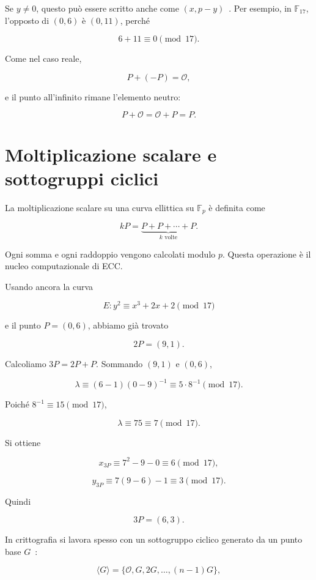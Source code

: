 \documentclass[12pt,a4paper,oneside]{report}
\begin{document}
Se \(y\neq 0\), questo può essere scritto anche come \((x,p-y)\)~\cite{margara_ec}. Per esempio, in \(\mathbb{F}_{17}\), l'opposto di \((0,6)\) è \((0,11)\), perché

\[
6+11\equiv 0\pmod{17}.
\]

Come nel caso reale,

\[
P+(-P)=\mathcal{O},
\]

e il punto all'infinito rimane l'elemento neutro:

\[
P+\mathcal{O}=\mathcal{O}+P=P.
\]

\section{Moltiplicazione scalare e sottogruppi ciclici}

La moltiplicazione scalare su una curva ellittica su \(\mathbb{F}_p\) è definita come~\cite{margara_ec,sec1}

\begin{equation}
    kP=\underbrace{P+P+\cdots+P}_{k\text{ volte}}.
\end{equation}

Ogni somma e ogni raddoppio vengono calcolati modulo \(p\). Questa operazione è il nucleo computazionale di ECC.

Usando ancora la curva

\[
E: y^2\equiv x^3+2x+2\pmod{17}
\]

e il punto \(P=(0,6)\), abbiamo già trovato

\[
2P=(9,1).
\]

Calcoliamo \(3P=2P+P\). Sommando \((9,1)\) e \((0,6)\),

\[
\lambda \equiv (6-1)(0-9)^{-1}\equiv 5\cdot 8^{-1}\pmod{17}.
\]

Poiché \(8^{-1}\equiv 15\pmod{17}\),

\[
\lambda\equiv 75\equiv 7\pmod{17}.
\]

Si ottiene

\[
x_{3P}\equiv 7^2-9-0\equiv 6\pmod{17},
\]

\[
y_{3P}\equiv 7(9-6)-1\equiv 3\pmod{17}.
\]

Quindi

\[
3P=(6,3).
\]

In crittografia si lavora spesso con un sottogruppo ciclico generato da un punto base \(G\)~\cite{margara_ec,sec1}:

\begin{equation}
    \langle G\rangle=\{\mathcal{O},G,2G,\ldots,(n-1)G\},
\end{equation}
\end{document}
